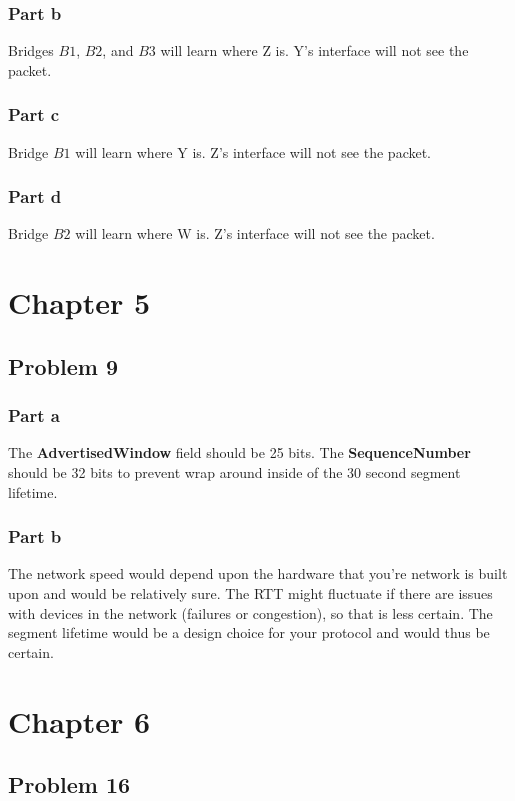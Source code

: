 \documentclass{article}%
\begin{document}
\subsubsection*{Part b}
Bridges $B1$, $B2$, and $B3$ will learn where Z is. Y's interface will not see the packet.

\subsubsection*{Part c}
Bridge $B1$ will learn where Y is. Z's interface will not see the packet.

\subsubsection*{Part d}
Bridge $B2$ will learn where W is. Z's interface will not see the packet.


\section*{Chapter 5}
\subsection*{Problem 9}
\subsubsection*{Part a}
The \textbf{AdvertisedWindow} field should be 25 bits. The \textbf{SequenceNumber} should be 32 bits to
prevent wrap around inside of the 30 second segment lifetime.

\subsubsection*{Part b}
The network speed would depend upon the hardware that you're network is built upon and would be relatively sure. The RTT might
fluctuate if there are issues with devices in the network (failures or congestion), so that is less certain. The segment lifetime
would be a design choice for your protocol and would thus be certain.


\section*{Chapter 6}
\subsection*{Problem 16}
\end{document}
